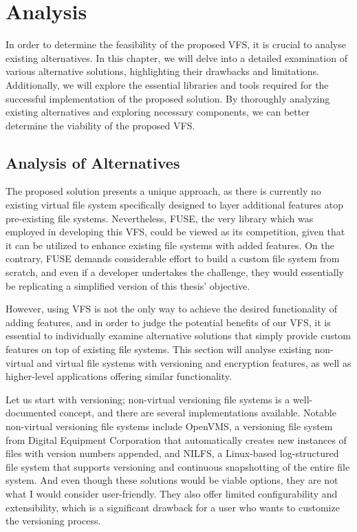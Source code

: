 \chapter{Analysis}
\label{chap:analysis}

In order to determine the feasibility of the proposed VFS, it is crucial to analyse existing alternatives.
In this chapter, we will delve into a detailed examination of various alternative solutions, highlighting their drawbacks and limitations.
Additionally, we will explore the essential libraries and tools required for the successful implementation of the proposed solution.
By thoroughly analyzing existing alternatives and exploring necessary components, we can better determine the viability of the proposed VFS.


\section{Analysis of Alternatives}\label{sec:alternatives}

The proposed solution presents a unique approach, as there is currently no existing virtual file system specifically designed to layer additional features atop pre-existing file systems.
Nevertheless, FUSE, the very library which was employed in developing this VFS, could be viewed as its competition, given that it can be utilized to enhance existing file systems with added features.
On the contrary, FUSE demands considerable effort to build a custom file system from scratch, and even if a developer undertakes the challenge, they would essentially be replicating a simplified version of this thesis' objective.

However, using VFS is not the only way to achieve the desired functionality of adding features, and in order to judge the potential benefits of our VFS, it is essential to individually examine alternative solutions that simply provide custom features on top of existing file systems.
This section will analyse existing non-virtual and virtual file systems with versioning and encryption features, as well as higher-level applications offering similar functionality.

Let us start with versioning; non-virtual versioning file systems is a well-documented concept, and there are several implementations available.
Notable non-virtual versioning file systems include OpenVMS, a versioning file system from Digital Equipment Corporation that automatically creates new instances of files with version numbers appended, and NILFS, a Linux-based log-structured file system that supports versioning and continuous snapshotting of the entire file system.
And even though these solutions would be viable options, they are not what I would consider user-friendly.
They also offer limited configurability and extensibility, which is a significant drawback for a user who wants to customize the versioning process.

